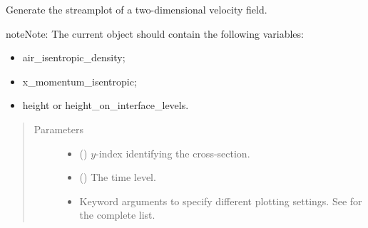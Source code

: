 \documentclass[letterpaper,10pt,english]{sphinxmanual}
\begin{document}
\begin{fulllineitems}
\begin{fulllineitems}
\begin{quote}
\begin{description}
\begin{itemize}
\end{itemize}

\end{description}\end{quote}

\end{fulllineitems}


\begin{fulllineitems}
\label{\detokenize{api:tasmania.storages.state_isentropic.StateIsentropic.streamplot_xz}}
Generate the streamplot of a two-dimensional velocity field.

\begin{sphinxadmonition}{note}{Note:}
The current object should contain the following variables:
\begin{itemize}
\item {} 
air\_isentropic\_density;

\item {} 
x\_momentum\_isentropic;

\item {} 
height or height\_on\_interface\_levels.

\end{itemize}
\end{sphinxadmonition}
\begin{quote}\begin{description}
\item[{Parameters}] \leavevmode\begin{itemize}
\item {} 
 () \textendash{} \(y\)-index identifying the cross-section.

\item {} 
 () \textendash{} The time level.

\item {} 
 \textendash{} Keyword arguments to specify different plotting settings.
See {\hyperref[\detokenize{api:tasmania.utils.utils_plot.streamplot_xz}]{}} for the complete list.

\end{itemize}

\end{description}\end{quote}

\end{fulllineitems}


\end{fulllineitems}
\end{document}
